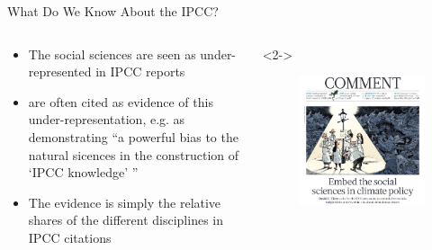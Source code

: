 \documentclass[9pt, aspectratio=169]{beamer}
\begin{document}
\begin{frame}{What Do We Know About the IPCC?}
\begin{columns}
	\begin{column}{0.618\linewidth}
		\begin{itemize}
			\item<2-> The social sciences are seen as under-represented in IPCC reports
			\item<3-> \citep{Bjurström2011} are often cited as evidence of this under-representation, e.g. as demonstrating ``a powerful bias to the natural sicences in the construction of `IPCC knowledge' '' \cite{Hulme2010}
			\item<4-> The evidence is simply the relative shares of the different disciplines in IPCC citations
			
		\end{itemize}
	\end{column}
	\begin{column}{0.382\linewidth}<2->
		\begin{figure}[h!]
			\begin{center}
				\includegraphics[width=0.85\linewidth]{../plots/victor.png}
				\caption{\citep{Victor2015}}
			\end{center}
		\end{figure}
	\end{column}
\end{columns}
\end{frame}
\end{document}
